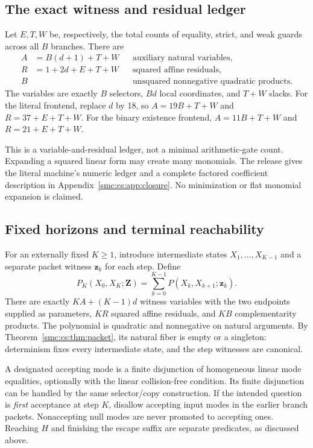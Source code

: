 \documentclass[11pt,letterpaper]{article}
\numberwithin{equation}{section}
\theoremstyle{definition}
\theoremstyle{remark}
\begin{document}
\subsection{The exact witness and residual ledger}
Let $E,T,W$ be, respectively, the total counts of equality, strict, and weak guards across all $B$ branches. There are
\begin{align}
 A&=B(d+1)+T+W &&\text{auxiliary natural variables},\label{smc:cs:eq:variables}\\
 R&=1+2d+E+T+W &&\text{squared affine residuals},\label{smc:cs:eq:residual-count}\\
 B&&&\text{unsquared nonnegative quadratic products}.\nonumber
\end{align}
The variables are exactly $B$ selectors, $Bd$ local coordinates, and $T+W$ slacks. For the literal frontend, replace $d$ by 18, so $A=19B+T+W$ and $R=37+E+T+W$. For the binary existence frontend, $A=11B+T+W$ and $R=21+E+T+W$.

This is a variable-and-residual ledger, not a minimal arithmetic-gate count. Expanding a squared linear form may create many monomials. The release gives the literal machine's numeric ledger and a complete factored coefficient description in Appendix~\ref{smc:cs:app:closure}. No minimization or flat monomial expansion is claimed.

\subsection{Fixed horizons and terminal reachability}
For an externally fixed $K\ge1$, introduce intermediate states $X_1,\ldots,X_{K-1}$ and a separate packet witness $\mathbf z_k$ for each step. Define
\begin{equation}\label{smc:cs:eq:trace}
 P_K(X_0,X_K;\mathbf Z)
   =\sum_{k=0}^{K-1}P(X_k,X_{k+1};\mathbf z_k).
\end{equation}
There are exactly $KA+(K-1)d$ witness variables with the two endpoints supplied as parameters, $KR$ squared affine residuals, and $KB$ complementarity products. The polynomial is quadratic and nonnegative on natural arguments. By Theorem~\ref{smc:cs:thm:packet}, its natural fiber is empty or a singleton: determinism fixes every intermediate state, and the step witnesses are canonical.

A designated accepting mode is a finite disjunction of homogeneous linear mode equalities, optionally with the linear collision-free condition. Its finite disjunction can be handled by the same selector/copy construction. If the intended question is \emph{first} acceptance at step $K$, disallow accepting input modes in the earlier branch packets. Nonaccepting null modes are never promoted to accepting ones. Reaching $H$ and finishing the escape suffix are separate predicates, as discussed above.
\end{document}
